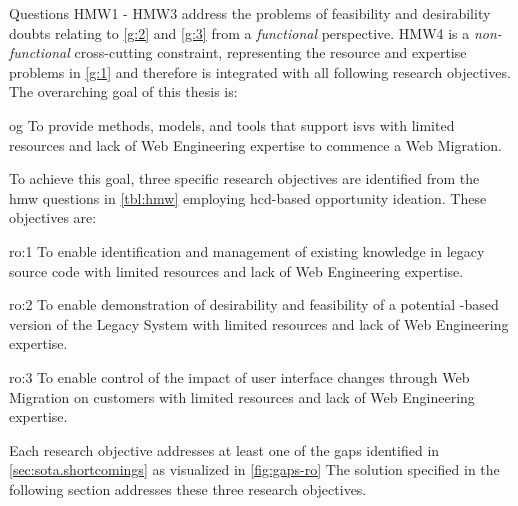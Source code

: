 \vspace{-15pt}
Questions HMW1 - HMW3 address the problems of feasibility and desirability doubts relating to \cref{g:2} and \cref{g:3} from a \emph{functional} \autocite{ISO/IEEE24765Vocabulary} perspective.
HMW4 is a \emph{non-functional} \autocite{ISO/IEEE24765Vocabulary} cross-cutting constraint, representing the resource and expertise problems in \cref{g:1} and therefore is integrated with all following research objectives.
The overarching goal of this thesis is:

\vspace{-15pt}
\begin{overarchinggoal}{og}
To provide methods, models, and tools that support \glspl{isv} with limited resources and lack of \gls{Web Engineering} expertise to commence a \gls{Web Migration}.
\end{overarchinggoal}

To achieve this goal, three specific research objectives are identified from the \gls{hmw} questions in \cref{tbl:hmw} employing \gls{hcd}-based opportunity ideation.
These objectives are:

\begin{researchobjective}{ro:1}
To enable identification and management of existing knowledge in legacy source code with limited resources and lack of \gls{Web Engineering} expertise.
\end{researchobjective}

\begin{researchobjective}{ro:2}
To enable demonstration of desirability and feasibility of a potential -based version of the \gls{Legacy System} with limited resources and lack of \gls{Web Engineering} expertise.
\end{researchobjective}

\begin{researchobjective}{ro:3}
To enable control of the impact of user interface changes through \gls{Web Migration} on customers with limited resources and lack of \gls{Web Engineering} expertise.
\end{researchobjective}

Each research objective addresses at least one of the gaps identified in \cref{sec:sota.shortcomings} as visualized in \cref{fig:gaps-ro}
The solution specified in the following section addresses these three research objectives.

